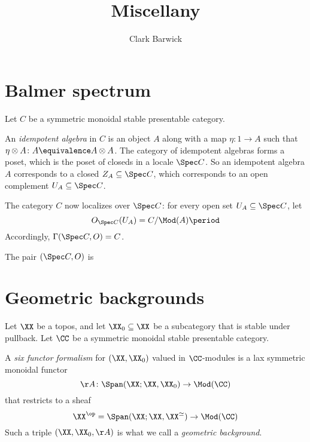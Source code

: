 \documentclass[draft=false, leqno]{article}
\title{Miscellany}
\author{Clark Barwick}
\begin{document}
\maketitle

\setcounter{tocdepth}{2}
\tableofcontents

\section{Balmer spectrum}

Let $C$ be a symmetric monoidal stable presentable category.

An \emph{idempotent algebra} in $C$ is an object $A$ along with a map $\eta \colon 1 \to A$ such that $\eta \otimes A \colon A \equivalence A \otimes A$.
The category of idempotent algebras forms a poset, which is the poset of closeds in a locale $\Spec C$.
So an idempotent algebra $A$ corresponds to a closed $Z_A \subseteq \Spec C$, which corresponds to an open complement $U_A \subseteq \Spec C$. 

The category $C$ now localizes over $\Spec C$:
for every open set $U_A \subseteq \Spec C$, let
\[
  O_{\Spec C}(U_A) = C/\Mod(A) \period
\]
Accordingly, $\Gamma(\Spec C, O) = C$.

The pair $(\Spec C, O)$ is 

\section{Geometric backgrounds}

Let $\XX$ be a topos, and
let $\XX_0 \subseteq \XX$ be a subcategory that is stable under pullback.
Let $\CC$ be a symmetric monoidal stable presentable category.

A \emph{six functor formalism} for $(\XX,\XX_0)$ valued in $\CC$-modules is a lax symmetric monoidal functor
\[
  \AA \colon \Span(\XX; \XX,\XX_0) \to \Mod(\CC)
\]
that restricts to a sheaf
\[
  \XX^{\op} = \Span(\XX; \XX,\XX^{\simeq}) \to \Mod(\CC)
\]
Such a triple $(\XX,\XX_0,\AA)$ is what we call a \emph{geometric background}.



\end{document}
